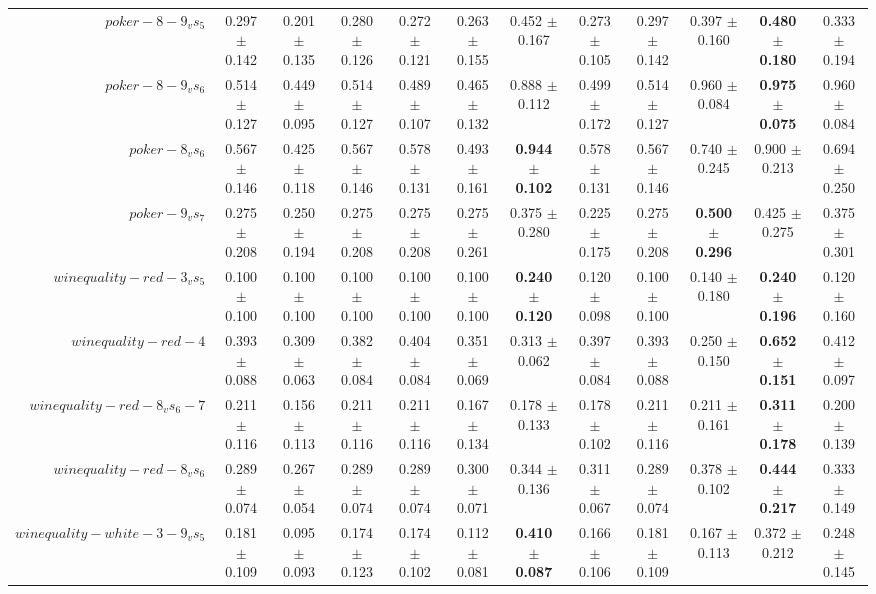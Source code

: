 \begin{table}[!ht]
{\begin{tabular}{r c c c c c c c c c c c}
$poker-8-9_vs_5$ & 0.297 $\pm$ 0.142 & 0.201 $\pm$ 0.135 & 0.280 $\pm$ 0.126 & 0.272 $\pm$ 0.121 & 0.263 $\pm$ 0.155 & 0.452 $\pm$ 0.167 & 0.273 $\pm$ 0.105 & 0.297 $\pm$ 0.142 & 0.397 $\pm$ 0.160 & \textbf{0.480 $\pm$ 0.180} & 0.333 $\pm$ 0.194 \\
$poker-8-9_vs_6$ & 0.514 $\pm$ 0.127 & 0.449 $\pm$ 0.095 & 0.514 $\pm$ 0.127 & 0.489 $\pm$ 0.107 & 0.465 $\pm$ 0.132 & 0.888 $\pm$ 0.112 & 0.499 $\pm$ 0.172 & 0.514 $\pm$ 0.127 & 0.960 $\pm$ 0.084 & \textbf{0.975 $\pm$ 0.075} & 0.960 $\pm$ 0.084 \\
$poker-8_vs_6$ & 0.567 $\pm$ 0.146 & 0.425 $\pm$ 0.118 & 0.567 $\pm$ 0.146 & 0.578 $\pm$ 0.131 & 0.493 $\pm$ 0.161 & \textbf{0.944 $\pm$ 0.102} & 0.578 $\pm$ 0.131 & 0.567 $\pm$ 0.146 & 0.740 $\pm$ 0.245 & 0.900 $\pm$ 0.213 & 0.694 $\pm$ 0.250 \\
$poker-9_vs_7$ & 0.275 $\pm$ 0.208 & 0.250 $\pm$ 0.194 & 0.275 $\pm$ 0.208 & 0.275 $\pm$ 0.208 & 0.275 $\pm$ 0.261 & 0.375 $\pm$ 0.280 & 0.225 $\pm$ 0.175 & 0.275 $\pm$ 0.208 & \textbf{0.500 $\pm$ 0.296} & 0.425 $\pm$ 0.275 & 0.375 $\pm$ 0.301 \\
$winequality-red-3_vs_5$ & 0.100 $\pm$ 0.100 & 0.100 $\pm$ 0.100 & 0.100 $\pm$ 0.100 & 0.100 $\pm$ 0.100 & 0.100 $\pm$ 0.100 & \textbf{0.240 $\pm$ 0.120} & 0.120 $\pm$ 0.098 & 0.100 $\pm$ 0.100 & 0.140 $\pm$ 0.180 & \textbf{0.240 $\pm$ 0.196} & 0.120 $\pm$ 0.160 \\
$winequality-red-4$ & 0.393 $\pm$ 0.088 & 0.309 $\pm$ 0.063 & 0.382 $\pm$ 0.084 & 0.404 $\pm$ 0.084 & 0.351 $\pm$ 0.069 & 0.313 $\pm$ 0.062 & 0.397 $\pm$ 0.084 & 0.393 $\pm$ 0.088 & 0.250 $\pm$ 0.150 & \textbf{0.652 $\pm$ 0.151} & 0.412 $\pm$ 0.097 \\
$winequality-red-8_vs_6-7$ & 0.211 $\pm$ 0.116 & 0.156 $\pm$ 0.113 & 0.211 $\pm$ 0.116 & 0.211 $\pm$ 0.116 & 0.167 $\pm$ 0.134 & 0.178 $\pm$ 0.133 & 0.178 $\pm$ 0.102 & 0.211 $\pm$ 0.116 & 0.211 $\pm$ 0.161 & \textbf{0.311 $\pm$ 0.178} & 0.200 $\pm$ 0.139 \\
$winequality-red-8_vs_6$ & 0.289 $\pm$ 0.074 & 0.267 $\pm$ 0.054 & 0.289 $\pm$ 0.074 & 0.289 $\pm$ 0.074 & 0.300 $\pm$ 0.071 & 0.344 $\pm$ 0.136 & 0.311 $\pm$ 0.067 & 0.289 $\pm$ 0.074 & 0.378 $\pm$ 0.102 & \textbf{0.444 $\pm$ 0.217} & 0.333 $\pm$ 0.149 \\
$winequality-white-3-9_vs_5$ & 0.181 $\pm$ 0.109 & 0.095 $\pm$ 0.093 & 0.174 $\pm$ 0.123 & 0.174 $\pm$ 0.102 & 0.112 $\pm$ 0.081 & \textbf{0.410 $\pm$ 0.087} & 0.166 $\pm$ 0.106 & 0.181 $\pm$ 0.109 & 0.167 $\pm$ 0.113 & 0.372 $\pm$ 0.212 & 0.248 $\pm$ 0.145 \\

\end{tabular}}
\end{table}
